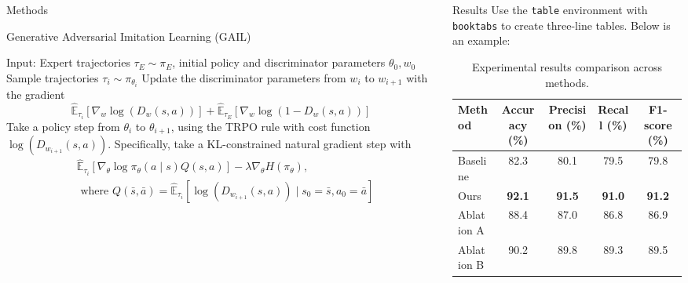 \begin{frame}[t]
\begin{columns}[t]
\begin{column}{\colwidth}
\begin{block}{Methods}

    \begin{pseudoalgorithm}{Generative Adversarial Imitation Learning (GAIL)}
    \begin{algorithmic}[1]
        \State Input: Expert trajectories $\tau_E \sim \pi_E$, initial policy and discriminator parameters $\theta_0, w_0$
            \State Sample trajectories $\tau_i \sim \pi_{\theta_i}$
            \State Update the discriminator parameters from $w_i$ to $w_{i+1}$ with the gradient
            $$
                \hat{\mathbb{E}}_{\tau_i}\left[\nabla_w \log \left(D_w(s, a)\right)\right]+\hat{\mathbb{E}}_{\tau_E}\left[\nabla_w \log \left(1-D_w(s, a)\right)\right]
            $$
            \State Take a policy step from $\theta_i$ to $\theta_{i+1}$, using the TRPO rule with cost function $\log \left(D_{w_{i+1}}(s, a)\right)$. Specifically, take a KL-constrained natural gradient step with
            \begin{align*}
                & \hat{\mathbb{E}}_{\tau_i}\left[\nabla_\theta \log \pi_\theta(a \mid s) Q(s, a)\right]-\lambda \nabla_\theta H\left(\pi_\theta\right), \\
                & \text { where } Q(\bar{s}, \bar{a})=\hat{\mathbb{E}}_{\tau_i}\left[\log \left(D_{w_{i+1}}(s, a)\right) \mid s_0=\bar{s}, a_0=\bar{a}\right]
            \end{align*}
        \EndFor
        \end{algorithmic}
    \end{pseudoalgorithm}
  \end{block}

\end{column}

\separatorcolumn

\begin{column}{\colwidth}
  \begin{block}{Results}
    Use the \texttt{table} environment with \texttt{booktabs} to create three-line tables. Below is an example:

    \begin{table}
      \centering
      \caption{Experimental results comparison across methods.}
      \label{tab:results1}
      \begin{tabular}{lcccc}
        \toprule
        \textbf{Method} & \textbf{Accuracy (\%)} & \textbf{Precision (\%)} & \textbf{Recall (\%)} & \textbf{F1-score (\%)} \\
        \midrule
        Baseline       & 82.3 & 80.1 & 79.5 & 79.8 \\
        Ours    & \textbf{92.1} & \textbf{91.5} & \textbf{91.0} & \textbf{91.2} \\
        Ablation A     & 88.4 & 87.0 & 86.8 & 86.9 \\
        Ablation B     & 90.2 & 89.8 & 89.3 & 89.5 \\
        \bottomrule
      \end{tabular}
    \end{table}


\end{block}
\end{column}
\end{columns}
\end{frame}
